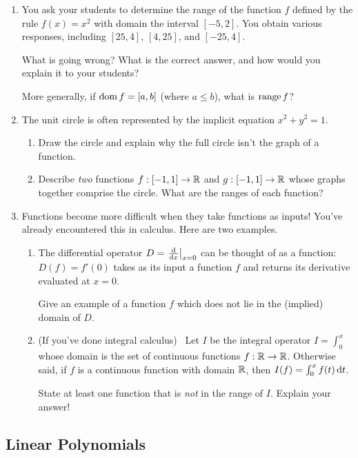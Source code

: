 \begin{exercises}{}{}
\begin{enumerate}
	  
	  \item You ask your students to determine the range of the function $f$ defined by the rule $f(x)=x^2$ with domain the interval $[-5,2]$. You obtain various responses, including $[25,4]$, $[4,25]$, and $[-25,4]$.\par
	  What is going wrong? What is the correct answer, and how would you explain it to your students?\par
	  More generally, if $\operatorname{dom} f=[a,b]$ (where $a\le b$), what is $\operatorname{range} f$?
	  
	  
	  \item The unit circle is often represented by the implicit equation $x^2+y^2=1$.
	  \begin{enumerate}
	    \item Draw the circle and explain why the full circle isn't the graph of a function.
	    \item Describe \emph{two} functions $f:[-1,1]\to\mathbb{R}$ and $g:[-1,1]\to\mathbb{R}$ whose graphs together comprise the circle. What are the ranges of each function?
	  \end{enumerate}
	  
	  
	  \item Functions become more difficult when they take functions as inputs! You've already encountered this in calculus. Here are two examples.
	  \begin{enumerate}
	    \item The differential operator $D=\left.\frac{\mathrm{d} }{\mathrm{d} x}\right|_{x=0}$ can be thought of as a function: $D(f)=f'(0)$ takes as its input a function $f$ and returns its derivative evaluated at $x=0$.\par
	    Give an example of a function $f$ which does not lie in the (implied) domain of $D$.
	    
	    \item (If you've done integral calculus) \ Let $I$ be the integral operator $I=\int_0^x$ whose domain is the set of continuous functions $f:\mathbb{R}\to\mathbb{R}$. Otherwise said, if $f$ is a continuous function with domain $\mathbb{R}$, then $I(f)=\int_0^xf(t)\,{\mathrm{d} t}$.\par
	    State at least one function that is \emph{not} in the range of $I$. Explain your answer!
		\end{enumerate} 
	\end{enumerate}
\end{exercises}

\clearpage



\subsection{Linear Polynomials}

